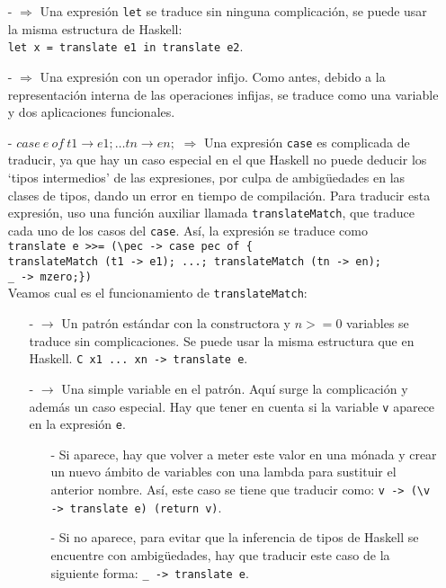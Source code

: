 \documentclass[class=article, crop=false]{standalone}
\begin{document}
\begin{itemize}
  \item[-]{} $\Rightarrow$ Una expresión
  \verb`let` se traduce sin ninguna complicación, se puede usar la misma estructura de
  Haskell: \\
  \verb`let x = translate e1 in translate e2`.

  \item[-]{} $\Rightarrow$ Una expresión con un
  operador infijo. Como antes, debido a la representación interna de las operaciones infijas,
  se traduce como una variable y dos aplicaciones funcionales.

  \item[-]$case \: e \: of \: t1 \rightarrow e1 ; \ldots tn \rightarrow en ;$ $\Rightarrow$
  Una expresión \verb`case` es complicada de traducir, ya que hay un caso especial en el que
  Haskell no puede deducir los `tipos intermedios' de las expresiones, por culpa de
  ambigüedades en las clases de tipos, dando un error en tiempo de compilación. Para traducir
  esta expresión, uso una función auxiliar llamada \verb`translateMatch`, que traduce cada
  uno de los casos del \verb`case`. Así, la expresión se traduce como \\
  \verb`translate e >>= (\pec -> case pec of {`\\
  \verb`translateMatch (t1 -> e1); ...; translateMatch (tn -> en);`\\
  \verb`_ -> mzero;})` \\
  Veamos cual es el funcionamiento de \verb`translateMatch`:
  \begin{itemize}
    \item[-]{}
    $\rightarrow$ Un patrón estándar con la constructora y $n>=0$ variables se traduce sin
    complicaciones. Se puede usar la misma estructura que en Haskell.
    \verb`C x1 ... xn -> translate e`.

    \item[-] $\rightarrow$ Una simple variable
    en el patrón. Aquí surge la complicación y además un caso especial. Hay que tener en
    cuenta si la variable \verb`v` aparece en la expresión \verb`e`.
    \begin{itemize}
      \item[-] Si aparece, hay que volver a meter este valor en una mónada y crear un nuevo
      ámbito de variables con una lambda para sustituir el anterior nombre. Así, este caso
      se tiene que traducir como: \verb`v -> (\v -> translate e) (return v)`.
      \item[-] Si no aparece, para evitar que la inferencia de tipos de Haskell se encuentre
      con ambigüedades, hay que traducir este caso de la siguiente forma:
      \verb`_ -> translate e`.
    \end{itemize}
  \end{itemize}
\end{itemize}
\end{document}
